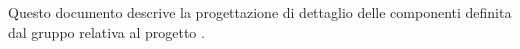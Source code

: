 Questo documento descrive la progettazione di dettaglio delle componenti definita dal gruppo \gruppo{} relativa al progetto \progetto.
